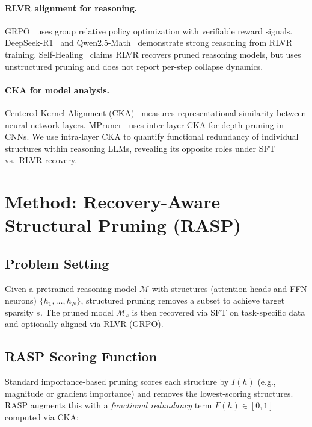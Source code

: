 \documentclass[11pt]{article}
\begin{document}
\paragraph{RLVR alignment for reasoning.}
GRPO~\citep{grpo2025} uses group relative policy optimization with verifiable reward signals.
DeepSeek-R1~\citep{deepseekr1} and Qwen2.5-Math~\citep{qwen25math} demonstrate strong reasoning from RLVR training.
Self-Healing~\citep{selfhealing2025} claims RLVR recovers pruned reasoning models, but uses unstructured pruning and does not report per-step collapse dynamics.

\paragraph{CKA for model analysis.}
Centered Kernel Alignment (CKA)~\citep{cka2019} measures representational similarity between neural network layers.
MPruner~\citep{mpruner2024} uses inter-layer CKA for depth pruning in CNNs.
We use intra-layer CKA to quantify functional redundancy of individual structures within reasoning LLMs, revealing its opposite roles under SFT vs.\ RLVR recovery.

\section{Method: Recovery-Aware Structural Pruning (RASP)}

\subsection{Problem Setting}

Given a pretrained reasoning model $\mathcal{M}$ with structures (attention heads and FFN neurons) $\{h_1, \ldots, h_N\}$, structured pruning removes a subset to achieve target sparsity $s$.
The pruned model $\mathcal{M}_s$ is then recovered via SFT on task-specific data and optionally aligned via RLVR (GRPO).

\subsection{RASP Scoring Function}

Standard importance-based pruning scores each structure by $I(h)$ (e.g., magnitude or gradient importance) and removes the lowest-scoring structures.
RASP augments this with a \emph{functional redundancy} term $F(h) \in [0,1]$ computed via CKA:
\end{document}
